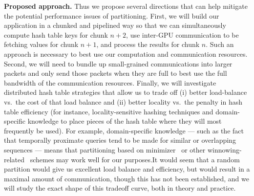 \noindent
{\bf Proposed approach.}
Thus we propose several directions that can help mitigate the potential performance issues of partitioning. First, we will build our application in a chunked and pipelined way so that we can simultaneously compute hash table keys for chunk $n+2$, use inter-GPU communication to be fetching values for chunk $n+1$, and process the results for chunk $n$. Such an approach is necessary to best use our computation and communication resources. Second, we will need to bundle up small-grained communications into larger packets and only send those packets when they are full to best use the full bandwidth of the communication resources. Finally, we will investigate distributed hash table strategies that allow us to trade off (i) better load-balance vs.\ the cost of that load balance and (ii) better locality vs.\ the penalty in hash table efficiency (for instance, locality-sensitive hashing techniques and domain-specific knowledge to place pieces of the hash table where they will most frequently be used).    
For example, domain-specific knowledge --- such as the fact that temporally proximate queries tend to be made for similar or overlapping sequences --- means that partitioning based on minimizer~\cite{roberts2004reducing} or other winnowing-related~\cite{Mar_ais_2018,DeBlasio_2019,Dutta_2022} schemes may work well for our purposes.It would seem that a random partition would give us excellent load balance and efficiency, but would result in a maximal amount of communication, though this has not been established, and we will study the exact shape of this tradeoff curve, both in theory and practice.





